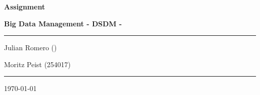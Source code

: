 \documentclass[12pt]{article}
\begin{document}
\begin{titlepage}
	\centering
	\par\vspace{0.75cm}
	{\huge\bfseries Assignment~\nass\par}
    {\large\bfseries Big Data Management - DSDM -~\gr\par}
	\vspace{0.25cm}
    \noindent\rule{\textwidth}{1pt}
    {\Large Julian Romero ()\par}
	{\Large Moritz Peist (254017)\par}
    \noindent\rule{\textwidth}{1pt}
	\vfill
	{\large \today\par}
\end{titlepage}



\newpage

\end{document}
